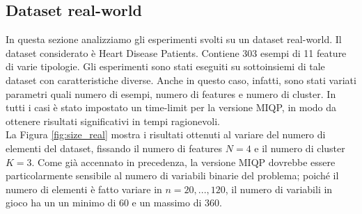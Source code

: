 \documentclass{article}
\begin{document}
    \subsection{Dataset real-world}
    In questa sezione analizziamo gli esperimenti svolti su un dataset real-world. Il dataset considerato è Heart Disease Patients. Contiene 303 esempi di 11 feature di varie tipologie.
    Gli esperimenti sono stati eseguiti su sottoinsiemi di tale dataset con caratteristiche diverse. Anche in questo caso, infatti, sono stati variati parametri quali numero di esempi, numero di features e numero di cluster. In tutti i casi è stato impostato un time-limit per la versione MIQP, in modo da ottenere risultati significativi in tempi ragionevoli.\\
    La Figura \ref{fig:size_real} mostra i risultati ottenuti al variare del numero di elementi del dataset, fissando il numero di features $N=4$ e il numero di cluster $K=3$. Come già accennato in precedenza, la versione MIQP dovrebbe essere particolarmente sensibile al numero di variabili binarie del problema; poiché il numero di elementi è fatto variare in $n=20,...,120$, il numero di variabili in gioco ha un un minimo di 60 e un massimo di 360.\\
\end{document}
